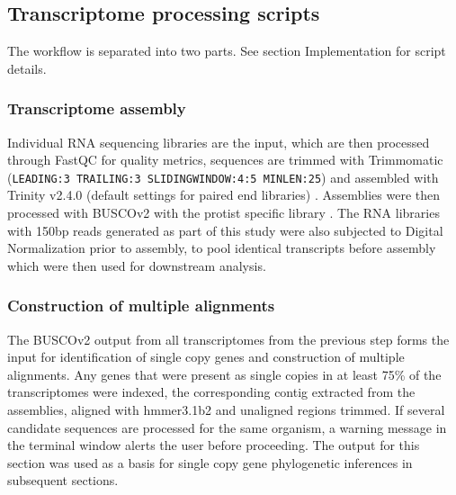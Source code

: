 \documentclass[fleqn,10pt,lineno]{wlpeerj} %
\begin{document}
\subsection*{Transcriptome processing scripts}
The workflow is separated into two parts. 
See section Implementation for script details.
\subsubsection*{Transcriptome assembly}
Individual RNA sequencing libraries are the input, which are then processed through FastQC \cite{fastqc} for quality metrics, sequences are trimmed with Trimmomatic (\texttt{LEADING:3 TRAILING:3 SLIDINGWINDOW:4:5 MINLEN:25}) \cite{bolger2014trimmomatic} and assembled with Trinity v2.4.0 (default settings for paired end libraries) \cite{haas2013novo}. 
Assemblies were then processed with BUSCOv2 with the protist specific library \cite{simao2015busco}.
The RNA libraries with 150bp reads generated as part of this study were also subjected to Digital Normalization \cite{diginorm} prior to assembly, to pool identical transcripts before assembly which were then used for downstream analysis.                                                                                                                                                                                                                                                                                                                                                                                                                                                                                                                                                                                                                                                                                                                                                                                                                                                                                                                                                                                                                                                                                                                                                                                                                                                                                                                                        
\subsubsection*{Construction of multiple alignments}
The BUSCOv2 output from all transcriptomes from the previous step forms the input for identification of single copy genes and construction of multiple alignments. 
Any genes that were present as single copies in at least 75\% of the transcriptomes were indexed, the corresponding contig extracted from the assemblies, aligned with hmmer3.1b2 \cite{eddy2015hmmer} and unaligned regions trimmed.
If several candidate sequences are processed for the same organism, a warning message in the terminal window alerts the user before proceeding. 
The output for this section was used as a basis for single copy gene phylogenetic inferences in subsequent sections.
\end{document}
